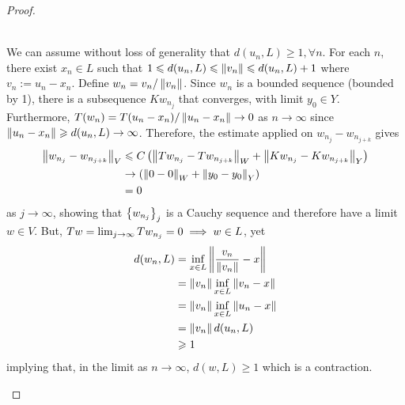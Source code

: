 \documentclass[12pt]{article}
\begin{document}
\begin{proof}
    \begin{case} \hfill \\
        We can assume without loss of generality that $d(u_n, L) \geq 1, \forall n$. For each $n$, there exist $x_n \in L$ such that $1 \leq d(u_n, L) \leq \norm[v_n] \leq d(u_n, L) + 1$ where $v_n := u_n - x_n$. Define $w_n = v_n / \norm[v_n]$. Since $w_n$ is a bounded sequence (bounded by 1), there is a subsequence $Kw_{n_j}$ that converges, with limit $y_0 \in Y$. Furthermore, $T(w_n) = T(u_n - x_n) / \norm[u_n - x_n] \to 0$ as $n \to \infty$ since $\norm[u_n - x_n] \geq d(u_n, L) \to \infty$. Therefore, the estimate applied on $w_{n_j} - w_{n_{j + k}}$ gives
        \begin{align*}
        \norm[w_{n_j} - w_{n_{j + k}}]_V
        & \leq C \brac{\norm[Tw_{n_j} - Tw_{n_{j + k}}]_W + \norm[Kw_{n_j} - Kw_{n_{j + k}}]_Y} \\
        & \to  \brac{\norm[0 - 0]_W + \norm[y_0 - y_0]_Y} \\
        & = 0 
        \end{align*}
        as $j \to \infty$, showing that $\set{w_{n_j}}_j$ is a Cauchy sequence and therefore have a limit $w \in V$. But, $Tw = \Lim[j] Tw_{n_j} = 0 \implies w \in L$, yet 
        \begin{align*}
        d(w_n, L) 
        &= \inf_{x \in L} \norm[\frac{v_n}{\norm[v_n]} - x] \\
        &= \norm[v_n] \inf_{x \in L} \norm[v_n - x] \\
        &= \norm[v_n] \inf_{x \in L} \norm[u_n - x] \\
        &= \norm[v_n] d(u_n, L) \\
        &\geq 1
        \end{align*}
        implying that, in the limit as $n \to \infty$, $d(w, L) \geq 1$ which is a contraction. \\
        
    \end{case}



\end{proof}
\end{document}
